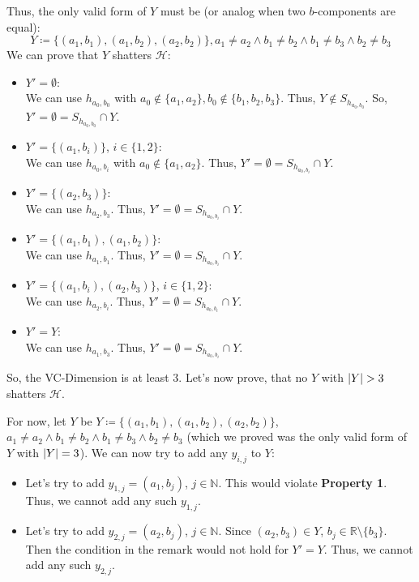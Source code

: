 \documentclass[12pt]{article}
\DeclarePairedDelimiter\abs{\lvert}{\rvert}
\begin{document}
\begin{enumerate}[label=(\alph*)]
			Thus, the only valid form of $Y$ must be (or analog when two $b$-components are equal):
			$$Y \coloneqq \{(a_1, b_1), (a_1, b_2), (a_2, b_2)\}, a_1 \neq a_2 \land b_1 \neq b_2 \land b_1 \neq b_3 \land b_2 \neq b_3$$
			We can prove that $Y$ shatters $\mathcal{H}$:
			\begin{itemize}
				\item	$Y' = \emptyset$: \\
						We can use $h_{a_0, b_0}$ with $a_0 \not\in \{a_1, a_2\}, b_0 \not\in \{b_1, b_2, b_3\}$. Thus, $Y \not\in S_{h_{a_0,b_0}}$. So, $Y' = \emptyset = S_{h_{a_0,b_0}} \cap Y$.
				\item	$Y' = \{(a_1, b_i)\}$, $i \in \{1,2\}$: \\
						We can use $h_{a_0, b_i}$ with $a_0 \not\in \{a_1, a_2\}$. Thus, $Y' = \emptyset = S_{h_{a_0,b_i}} \cap Y$.
				\item	$Y' = \{(a_2, b_3)\}$: \\
						We can use $h_{a_2, b_3}$. Thus, $Y' = \emptyset = S_{h_{a_0,b_i}} \cap Y$.
				\item	$Y' = \{(a_1, b_1), (a_1, b_2)\}$: \\
						We can use $h_{a_1, b_1}$. Thus, $Y' = \emptyset = S_{h_{a_0,b_i}} \cap Y$.
				\item	$Y' = \{(a_1, b_i), (a_2, b_3)\}$, $i \in \{1,2\}$: \\
						We can use $h_{a_2, b_i}$. Thus, $Y' = \emptyset = S_{h_{a_0,b_i}} \cap Y$.
				\item	$Y' = Y$: \\
						We can use $h_{a_1, b_3}$. Thus, $Y' = \emptyset = S_{h_{a_0,b_i}} \cap Y$.
			\end{itemize}
			So, the VC-Dimension is at least $3$. Let's now prove, that no $Y$ with $\abs{Y} > 3$ shatters $\mathcal{H}$.

			For now, let $Y$ be $Y \coloneqq \{(a_1, b_1), (a_1, b_2), (a_2, b_2)\}$, $a_1 \neq a_2 \land b_1 \neq b_2 \land b_1 \neq b_3 \land b_2 \neq b_3$ (which we proved was the only valid form of $Y$ with $\abs{Y} = 3$). We can now try to add any $y_{i,j}$ to $Y$:
			\begin{itemize}
				\item	Let's try to add $y_{1,j} = (a_1, b_j)$, $j \in \mathbb{N}$. This would violate \textbf{Property 1}. Thus, we cannot add any such $y_{1,j}$.

				\item	Let's try to add $y_{2,j} = (a_2, b_j)$, $j \in \mathbb{N}$. Since $(a_2, b_3) \in Y$, $b_j \in \mathbb{R}\setminus\{b_3\}$. Then the condition in the remark would not hold for $Y' = Y$. Thus, we cannot add any such $y_{2,j}$.


\end{itemize}
\end{enumerate}
\end{document}
